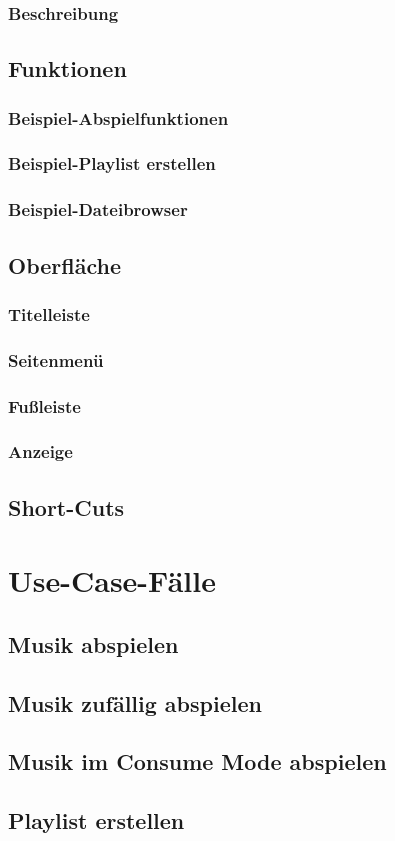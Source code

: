 \subsubsection{Beschreibung}
\subsection{Funktionen}
\subsubsection{Beispiel-Abspielfunktionen}
\subsubsection{Beispiel-Playlist erstellen}
\subsubsection{Beispiel-Dateibrowser}
\subsection{Oberfläche}
\subsubsection{Titelleiste}
\subsubsection{Seitenmenü}
\subsubsection{Fußleiste}
\subsubsection{Anzeige}
\subsection{Short-Cuts}
\section{Use-Case-Fälle}
\subsection{Musik abspielen}
\subsection{Musik zufällig abspielen}
\subsection{Musik im Consume Mode abspielen}
\subsection{Playlist erstellen}


